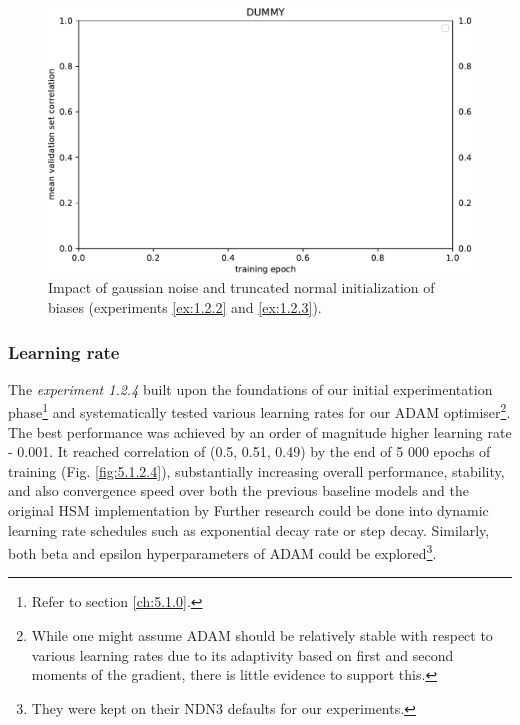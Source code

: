 \begin{figure}[H]
    \centering
    \includegraphics[width=1\textwidth]{../figures/05_dummy}
    \caption[Experiments 5.1.2.2 and 5.1.2.3]{Impact of gaussian noise and truncated normal initialization of biases (experiments \ref{ex:1.2.2} and \ref{ex:1.2.3}).}
    \label{fig:5.1.2.2}
\end{figure}

\subsubsection{Learning rate}\label{ex:1.2.4}

The \emph{experiment 1.2.4} built upon the foundations of our initial experimentation phase\footnote{Refer to section \ref{ch:5.1.0}.} and systematically tested various learning rates for our ADAM optimiser\footnote{While one might assume ADAM should be relatively stable with respect to various learning rates due to its adaptivity based on first and second moments of the gradient, there is little evidence to support this.}. The best performance was achieved by an order of magnitude higher learning rate - 0.001. It reached correlation of (0.5, 0.51, 0.49) by the end of 5 000 epochs of training (Fig. \ref{fig:5.1.2.4}), substantially increasing overall performance, stability, and also convergence speed over both the previous baseline models and the original HSM implementation by \citeauthor{antolik} Further research could be done into dynamic learning rate schedules such as exponential decay rate or step decay. Similarly, both beta and epsilon hyperparameters of ADAM could be explored\footnote{They were kept on their NDN3 defaults for our experiments.}.


